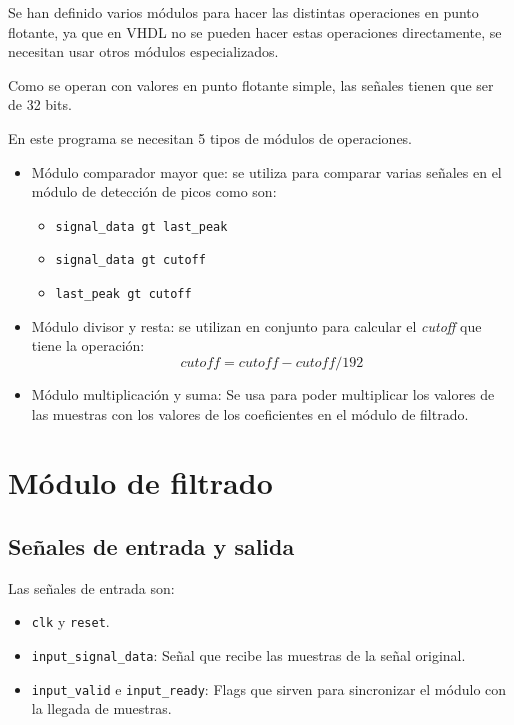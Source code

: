 Se han definido varios módulos para hacer las distintas operaciones en punto flotante, ya que en VHDL no se
pueden hacer estas operaciones directamente, se necesitan usar otros módulos especializados.

Como se operan con valores en punto flotante simple, las señales tienen que ser de 32 bits.

En este programa se necesitan 5 tipos de módulos de operaciones.

\begin{itemize}
    \item Módulo comparador mayor que: se utiliza para comparar varias señales en el módulo de detección de picos como son:
    \begin{itemize}
        \item \texttt{signal\_data gt last\_peak}
        \item \texttt{signal\_data gt cutoff}
        \item \texttt{last\_peak gt cutoff}
    \end{itemize}

    \item Módulo divisor y resta: se utilizan en conjunto para calcular el \textit{cutoff} que tiene la operación:
    \[cutoff = cutoff - cutoff/192\]

    \item Módulo multiplicación y suma: Se usa para poder multiplicar los valores de las muestras con los valores de los coeficientes en el módulo de filtrado.
    
\end{itemize}

\section{Módulo de filtrado}

\subsection{Señales de entrada y salida}

Las señales de entrada son:

\begin{itemize}
\item \texttt{clk} y \texttt{reset}.
\item \texttt{input\_signal\_data}: Señal que recibe las muestras de la señal original.
\item \texttt{input\_valid} e \texttt{input\_ready}: Flags que sirven para sincronizar el módulo con la llegada de muestras. 
\end{itemize}

